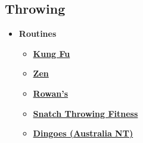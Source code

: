 \subsection*{Throwing}
\begin{itemize}
    \item \textbf{Routines}
    \begin{itemize}
        \item \textcolor{blue}{\textbf{\href{https://skydmagazine.com/2012/02/kung-fu-throwing/}{Kung Fu}}}
        \item \textcolor{blue}{\textbf{\href{https://skydmagazine.com/2011/11/wiggins-zen-throwing-routine/}{Zen}}}
        \item \textcolor{blue}{\textbf{\href{https://www.youtube.com/watch?v=rpqT8J6BzvY}{Rowan's}}}
        \item \textcolor{blue}{\textbf{\href{https://drive.google.com/file/d/0B709W22N3JYUQ0pIUGFDVUl0YzA/view?usp=sharing&resourcekey=0-AxEoG607eeDhZ4bPkMyDmw}{Snatch Throwing Fitness}}}
        \item \textcolor{blue}{\textbf{\href{https://drive.google.com/file/d/0B709W22N3JYUcDVBRks5cUZudms/view?usp=sharing&resourcekey=0-jC-dAK8sGnymfeI2aYrWgQ}{Dingoes (Australia NT)}}}
        

\end{itemize}
\end{itemize}
